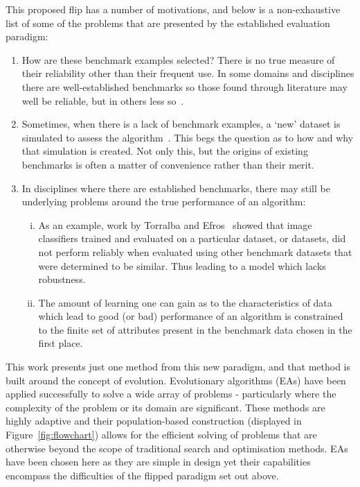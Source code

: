\documentclass[11pt]{article}
\begin{document}
This proposed flip has a number of motivations, and below is a non-exhaustive
list of some of the problems that are presented by the established evaluation
paradigm:
\begin{enumerate}
    \item How are these benchmark examples selected? There is no true measure of
        their reliability other than their frequent use. In some domains and
        disciplines there are well-established benchmarks so those found through
        literature may well be reliable, but in others less
        so~\cite{Campos2016,UCRArchive2018,Wang2015}.
    \item Sometimes, when there is a lack of benchmark examples, a `new' dataset
        is simulated to assess the algorithm~\cite{Olson2017}. This begs the
        question as to how and why that simulation is created. Not only this,
        but the origins of existing benchmarks is often a matter of convenience
        rather than their merit.
    \item In disciplines where there are established benchmarks, there may still
        be underlying problems around the true performance of an algorithm:
        \begin{enumerate}[(i)]
            \item As an example, work by Torralba and Efros~\cite{Torralba2011}
                showed that image classifiers trained and evaluated on a
                particular dataset, or datasets, did not perform reliably when
                evaluated using other benchmark datasets that were determined
                to be similar. Thus leading to a model which lacks robustness.
            \item The amount of learning one can gain as to the characteristics
                of data which lead to good (or bad) performance of an algorithm
                is constrained to the finite set of attributes present in the
                benchmark data chosen in the first place.
        \end{enumerate}
\end{enumerate}

This work presents just one method from this new paradigm, and that method is
built around the concept of evolution. Evolutionary algorithms (EAs) have been
applied successfully to solve a wide array of problems \-- particularly where
the complexity of the problem or its domain are significant. These methods are
highly adaptive and their population-based construction (displayed in
Figure~\ref{fig:flowchart}) allows for the efficient solving of problems that
are otherwise beyond the scope of traditional search and optimisation methods.
EAs have been chosen here as they are simple in design yet their capabilities
encompass the difficulties of the flipped paradigm set out above.
\end{document}
